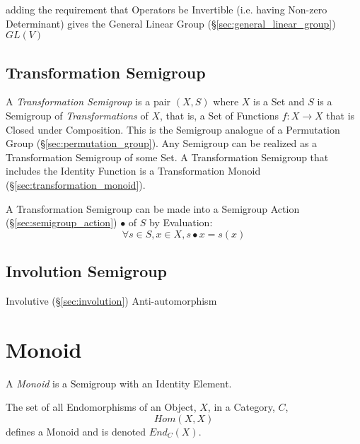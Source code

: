 adding the requirement that Operators be Invertible (i.e. having Non-zero
Determinant) gives the General Linear Group (\S\ref{sec:general_linear_group})
$GL(V)$



\subsection{Transformation Semigroup}\label{sec:transformation_semigroup}

A \emph{Transformation Semigroup} is a pair $(X,S)$ where $X$ is a Set
and $S$ is a Semigroup of \emph{Transformations} of $X$, that is, a
Set of Functions $f : X \rightarrow X$ that is Closed under
Composition. This is the Semigroup analogue of a Permutation Group
(\S\ref{sec:permutation_group}). Any Semigroup can be realized as a
Transformation Semigroup of some Set. A Transformation Semigroup that
includes the Identity Function is a Transformation Monoid
(\S\ref{sec:transformation_monoid}).

A Transformation Semigroup can be made into a Semigroup Action
(\S\ref{sec:semigroup_action}) $\bullet$ of $S$ by Evaluation:
\[
  \forall s \in S, x \in X, s \bullet x = s(x)
\]



\subsection{Involution Semigroup}\label{sec:involution_semigroup}

Involutive (\S\ref{sec:involution}) Anti-automorphism



\section{Monoid}\label{sec:monoid}

A \emph{Monoid} is a Semigroup with an Identity Element.

The set of all Endomorphisms of an Object, $X$, in a Category, $C$,
\[
    Hom(X,X)
\]
defines a Monoid and is denoted $End_C(X)$.

